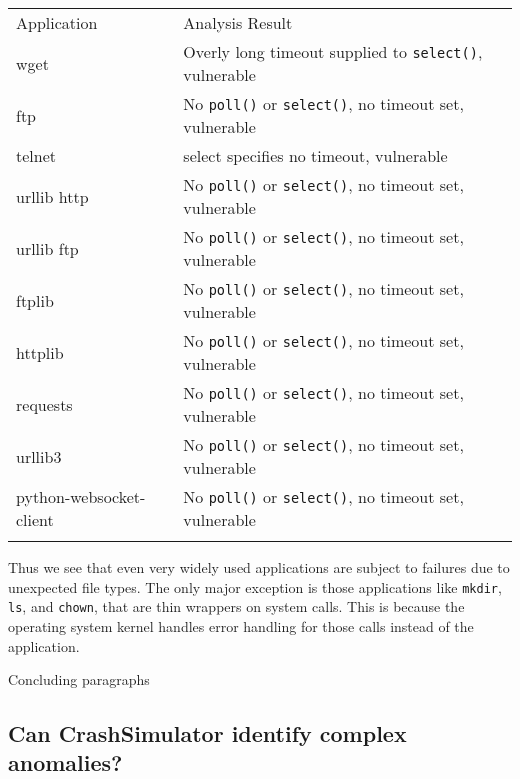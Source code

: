 \begin{table*}[t]
  \scriptsize{}
  \begin{tabular}{l | l}
    Application              & Analysis Result\\
    wget                     & Overly long timeout supplied to {\tt select()}, vulnerable\\
    ftp                      & No {\tt poll()} or {\tt select()}, no timeout set, vulnerable\\
    telnet                   & select specifies no timeout, vulnerable\\
    urllib http              & No {\tt poll()} or {\tt select()}, no timeout set, vulnerable\\
    urllib ftp               & No {\tt poll()} or {\tt select()}, no timeout set, vulnerable\\
    ftplib                   & No {\tt poll()} or {\tt select()}, no timeout set, vulnerable\\
    httplib                  & No {\tt poll()} or {\tt select()}, no timeout set, vulnerable\\
    requests                 & No {\tt poll()} or {\tt select()}, no timeout set, vulnerable\\
    urllib3                  & No {\tt poll()} or {\tt select()}, no timeout set, vulnerable\\
    python-websocket-client  & No {\tt poll()} or {\tt select()}, no timeout set, vulnerable\\
  \bottomrule{}
  \end{tabular}
\end{table*}



Thus we see that even very 
widely used applications are subject to failures due to unexpected file 
types.  The only major exception is those applications like {\tt mkdir}, 
{\tt ls}, and {\tt chown}, that are thin wrappers on system calls.  This 
is because the operating system kernel handles error handling for those 
calls instead of the application.


Concluding paragraphs









\subsection{Can CrashSimulator identify complex anomalies?}

